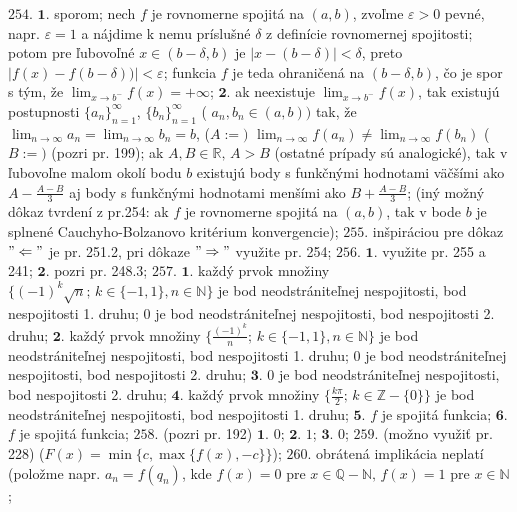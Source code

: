 $\boxed{254.}$ $\boldsymbol{1.}$ sporom; nech $f$ je rovnomerne spojitá na $(a,b)$, zvoľme $\varepsilon >0$ pevné, napr.   $ \varepsilon=1$ a nájdime k nemu príslušné $\delta$ z definície rovnomernej spojitosti; potom pre ľubovoľné $x \in (b-\delta, b) $ je $\vert x-(b-\delta) \vert < \delta$, preto $\vert f(x)-f(b-\delta)) \vert < \varepsilon$; funkcia $f$ je teda ohraničená na $(b-\delta, b) $, čo je spor s tým, že $\lim_{x \to b^{-} }f(x)=+\infty$;
$\boldsymbol{2.}$ ak neexistuje  $\lim_{x \to b^{-} }f(x)$, tak existujú postupnosti $\lbrace a_{n} \rbrace _{n=1}^{\infty} $, $\lbrace b_{n} \rbrace _{n=1}^{\infty} $ ( $a_{n}, b_{n} \in (a,b))$ tak, že $\lim_{n \to \infty }a_{n}=\lim_{n \to \infty }b_{n}=b$, ($A:=)$  $\lim_{n \to \infty }f(a_{n}) \ne \lim_{n \to \infty }f(b_{n})$ ($B:=)$ (pozri pr. 199); ak $A, B \in \mathbb{R}, \, A > B $ (ostatné prípady sú analogické), tak v ľubovoľne malom okolí bodu  $b$ existujú body s funkčnými hodnotami väčšími ako  $ A-\frac{A-B}{3} $ aj body s funkčnými hodnotami menšími ako  $ B+\frac{A-B}{3} $; (iný možný dôkaz tvrdení z pr.254: ak  $f $ je rovnomerne spojitá na  $(a,b) $, tak v bode  $b $ je splnené Cauchyho-Bolzanovo kritérium konvergencie);
$\boxed{255.}$ inšpiráciou pre dôkaz  $" \Leftarrow "$ je pr. 251.2, pri dôkaze $" \Rightarrow "$ využite pr. 254;
$\boxed{256.}$ $\boldsymbol{1.}$ využite pr. 255 a 241;
$\boldsymbol{2.}$ pozri pr. 248.3;
$\boxed{257.}$ $\boldsymbol{1.}$ každý prvok množiny $\lbrace (-1)^{k}\sqrt{n}; \, k \in \lbrace -1,1 \rbrace, n \in \mathbb{N}\rbrace $ je bod neodstrániteľnej nespojitosti, bod  nespojitosti 1. druhu; $0$ je bod neodstrániteľnej nespojitosti, bod  nespojitosti 2. druhu;
$\boldsymbol{2.}$ každý prvok množiny $\lbrace \frac{(-1)^{k}}{n}; \, k \in \lbrace -1,1 \rbrace, n \in \mathbb{N}\rbrace $ je bod neodstrániteľnej nespojitosti, bod  nespojitosti 1. druhu; $0$ je bod neodstrániteľnej nespojitosti, bod  nespojitosti 2. druhu;
$\boldsymbol{3.}$  $0$ je bod neodstrániteľnej nespojitosti, bod  nespojitosti 2. druhu;
$\boldsymbol{4.}$ každý prvok množiny $\lbrace \frac{k \pi}{2}; \, k \in  \mathbb{Z}- \lbrace 0 \rbrace\rbrace $ je bod neodstrániteľnej nespojitosti, bod  nespojitosti 1. druhu; 
$\boldsymbol{5.}$ $f$ je spojitá funkcia;
$\boldsymbol{6.}$ $f$ je spojitá funkcia; 
$\boxed{258.}$ (pozri pr. 192) $\boldsymbol{1.}$ $0$;
$\boldsymbol{2.}$ $1$;
$\boldsymbol{3.}$ $0$; 
$\boxed{259.}$ (možno využiť pr. 228) ($F(x)= \min \lbrace c, \max \lbrace f(x), -c \rbrace \rbrace $); 
$\boxed{260.}$ obrátená implikácia neplatí (položme napr. $ a_{n}=f(q_{n})$, kde $f(x)=0$ pre $x \in \mathbb{Q}-\mathbb{N}, \, f(x)=1 $ pre $x \in \mathbb{N}$ ;
